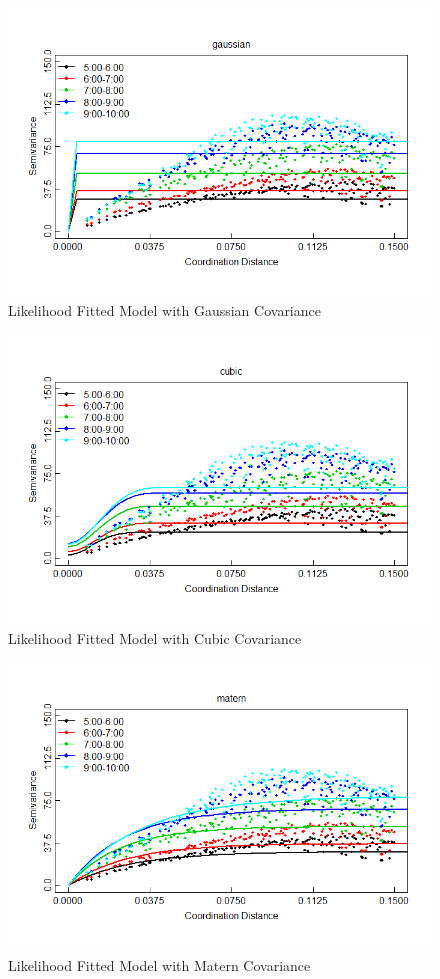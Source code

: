\documentclass[hidelinks,12pt]{article}
\begin{document}
\FloatBarrier
	\begin{figure}[!ht]
		\includegraphics[width=\textwidth]{lik_gaussian.png}
		\caption{Likelihood Fitted Model with Gaussian Covariance \label{fig:likgau}}
	\end{figure}
\FloatBarrier
	\begin{figure}[!ht]
		\includegraphics[width=\textwidth]{lik_cubic.png}
		\caption{Likelihood Fitted Model with Cubic Covariance \label{fig:likcub}}
	\end{figure}
\FloatBarrier
	\begin{figure}[!ht]
		\includegraphics[width=\textwidth]{lik_matern.png}
		\caption{Likelihood Fitted Model with Matern Covariance \label{fig:likmat}}
	\end{figure}
	\FloatBarrier
\end{document}
